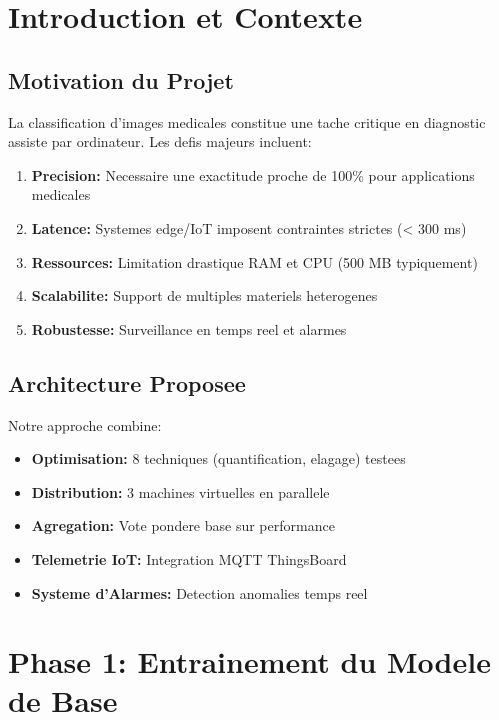 \documentclass[12pt,a4paper]{report}
\begin{document}
\newpage

\tableofcontents
\newpage

\chapter{Introduction et Contexte}

\section{Motivation du Projet}

La classification d'images medicales constitue une tache critique en diagnostic assiste par ordinateur. Les defis majeurs incluent:

\begin{enumerate}
    \item \textbf{Precision:} Necessaire une exactitude proche de 100\% pour applications medicales
    \item \textbf{Latence:} Systemes edge/IoT imposent contraintes strictes (< 300 ms)
    \item \textbf{Ressources:} Limitation drastique RAM et CPU (500 MB typiquement)
    \item \textbf{Scalabilite:} Support de multiples materiels heterogenes
    \item \textbf{Robustesse:} Surveillance en temps reel et alarmes
\end{enumerate}

\section{Architecture Proposee}

Notre approche combine:
\begin{itemize}
    \item \textbf{Optimisation:} 8 techniques (quantification, elagage) testees
    \item \textbf{Distribution:} 3 machines virtuelles en parallele
    \item \textbf{Agregation:} Vote pondere base sur performance
    \item \textbf{Telemetrie IoT:} Integration MQTT ThingsBoard
    \item \textbf{Systeme d'Alarmes:} Detection anomalies temps reel
\end{itemize}

\chapter{Phase 1: Entrainement du Modele de Base}
\end{document}
